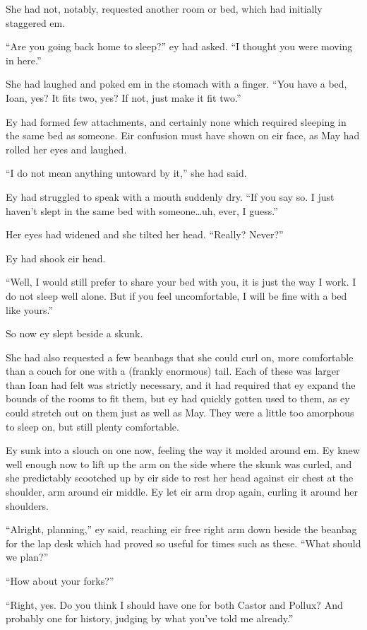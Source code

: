 She had not, notably, requested another room or bed, which had initially staggered em.

``Are you going back home to sleep?'' ey had asked. ``I thought you were moving in here.''

She had laughed and poked em in the stomach with a finger. ``You have a bed, Ioan, yes? It fits two, yes? If not, just make it fit two.''

Ey had formed few attachments, and certainly none which required sleeping in the same bed as someone. Eir confusion must have shown on eir face, as May had rolled her eyes and laughed.

``I do not mean anything untoward by it,'' she had said.

Ey had struggled to speak with a mouth suddenly dry. ``If you say so. I just haven't slept in the same bed with someone\ldots uh, ever, I guess.''

Her eyes had widened and she tilted her head. ``Really? Never?''

Ey had shook eir head.

``Well, I would still prefer to share your bed with you, it is just the way I work. I do not sleep well alone. But if you feel uncomfortable, I will be fine with a bed like yours.''

So now ey slept beside a skunk.

She had also requested a few beanbags that she could curl on, more comfortable than a couch for one with a (frankly enormous) tail. Each of these was larger than Ioan had felt was strictly necessary, and it had required that ey expand the bounds of the rooms to fit them, but ey had quickly gotten used to them, as ey could stretch out on them just as well as May. They were a little too amorphous to sleep on, but still plenty comfortable.

Ey sunk into a slouch on one now, feeling the way it molded around em. Ey knew well enough now to lift up the arm on the side where the skunk was curled, and she predictably scootched up by eir side to rest her head against eir chest at the shoulder, arm around eir middle. Ey let eir arm drop again, curling it around her shoulders.

``Alright, planning,'' ey said, reaching eir free right arm down beside the beanbag for the lap desk which had proved so useful for times such as these. ``What should we plan?''

``How about your forks?''

``Right, yes. Do you think I should have one for both Castor and Pollux? And probably one for history, judging by what you've told me already.''

